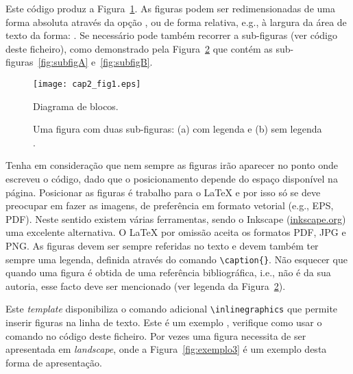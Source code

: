 Este código produz a Figura~\ref{fig:exemplo1}. As figuras podem ser redimensionadas de uma forma absoluta através da opção , ou de forma relativa, e.g., à largura da área de texto da forma: . Se necessário pode também recorrer a sub-figuras (ver código deste ficheiro), como demonstrado pela Figura~\ref{fig:exemplo2} que contém as sub-figuras~\ref{fig:subfigA} e~\ref{fig:subfigB}.

\begin{figure}[htbp]
	\centering
	\texttt{[image: cap2\_fig1.eps]}
	\caption{Diagrama de blocos.}
	\label{fig:exemplo1}
\end{figure}

\begin{figure}[htbp]
  \centering
  \caption[Uma figura com duas sub-figuras.]{Uma figura com duas sub-figuras: (a) com legenda e (b) sem legenda  \cite{Motorola96}.}
  \label{fig:exemplo2}
\end{figure}

Tenha em consideração que nem sempre as figuras irão aparecer no ponto onde escreveu o código, dado que o posicionamento depende do espaço disponível na página. Posicionar as figuras é trabalho para o \LaTeX{} e por isso só se deve preocupar em fazer as imagens, de preferência em formato vetorial (e.g., EPS, PDF). Neste sentido existem várias ferramentas, sendo o Inkscape (\url{inkscape.org}) uma excelente alternativa. O \LaTeX{} por omissão aceita os formatos PDF, JPG e PNG. As figuras devem ser sempre referidas no texto e devem também ter sempre uma legenda, definida através do comando \verb|\caption{}|. Não esquecer que quando uma figura é obtida de uma referência bibliográfica, i.e., não é da sua autoria, esse facto deve ser mencionado (ver legenda da Figura~\ref{fig:exemplo2}).

Este \textit{template} disponibiliza o comando adicional \verb|\inlinegraphics| que permite inserir figuras na linha de texto. Este é um exemplo , verifique como usar o comando no código deste ficheiro. Por vezes uma figura necessita de ser apresentada em \textit{landscape}, onde a Figura~\ref{fig:exemplo3} é um exemplo desta forma de apresentação.


